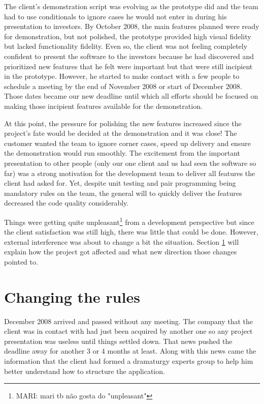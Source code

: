 \documentclass[lnbip]{svmultln}
\newcommand{\mari}[1]{\footnote{MARI: #1}}
\begin{document}
The client's demonstration script was evolving as the prototype did and the team
had to use conditionals to ignore cases he would not enter in during his
presentation to investors. By October 2008, the main features planned were ready
for demonstration, but not polished, the prototype provided high visual fidelity
but lacked functionality fidelity. Even so, the client was not feeling
completely confident to present the software to the investors because he had
discovered and prioritized new features that he felt were important but that
were still incipient in the prototype. However, he started to make contact with
a few people to schedule a meeting by the end of November 2008 or start of
December 2008. Those dates became our new deadline until which all efforts
should be focused on making those incipient features available for the
demonstration.

At this point, the pressure for polishing the new features increased since the
project's fate would be decided at the demonstration and it was close! The
customer wanted the team to ignore corner cases, speed up delivery and ensure
the demonstration would run smoothly. The excitement from the important
presentation to other people (only our one client and us had seen the software
so far) was a strong motivation for the development team to deliver all features
the client had asked for. Yet, despite unit testing and pair programming being
mandatory rules on the team, the general will to quickly deliver the features
decreased the code quality considerably.

Things were getting quite unpleasant\mari{mari tb não gosta do "unpleasant"}
from a development perspective but since the client satisfaction was still high,
there was little that could be done. However, external interference was about to
change a bit the situation. Section \ref{sec:changes} will explain how the
project got affected and what new direction those changes pointed to.

\section{Changing the rules}
\label{sec:changes}

December 2008 arrived and passed without any meeting. The company that
the client was in contact with had just been acquired by another one
so any project presentation was useless until things settled
down. That news pushed the deadline away for another 3 or 4 months at
least. Along with this news came the information that the client had
formed a dramaturgy experts group to help him better understand how to
structure the application.
\end{document}
